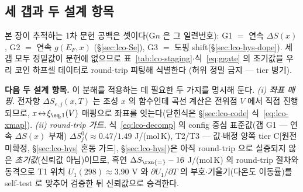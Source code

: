 \subsection{세 갭과 두 설계 항목}\label{sec:lco-decomp-gaps}
본 장이 추적하는 1차 문헌 공백은 셋이다(G$n$ 은 그 일련번호): G1 $=$ 연속 $\Delta S(x)$, G2 $=$ 연속 $g(E_F,x)$
(\S\ref{sec:lco-Se}), G3 $=$ 도핑 shift(\S\ref{sec:lco-hys-dope}). 세 갭 모두 정밀값이 문헌에 없으므로
표~\ref{tab:lco-staging}$\cdot$식~\eqref{eq:ggate} 의 초기값을 우리 코인 하프셀 데이터로 round-trip 피팅해 식별한다
(허위 정밀 금지 --- tier 병기).

\textbf{다음 두 설계 항목.} 이 분해를 적용하는 데 필요한 두 가지를 명시해 둔다.
\emph{(i) 좌표 매핑.} 전자항 $\Delta S_{e,j}(x,T)$ 는 조성 $x$ 의 함수인데 곡선 계산은 전위점 $V$ 에서 직접 진행되므로,
$x\!\leftrightarrow\!\xi_{\eq,1}(V)$ 매핑으로 좌표를 잇는다(닫힌식은 \S\ref{sec:lco-code} 식~\eqref{eq:lco-xmap}).
\emph{(ii) round-trip 가드.} 식~\eqref{eq:lco-decomp} 의 config 중심 표준값(갭 G1 --- 연속 $\Delta S(x)$ 부재)
$\Delta S_j^0$($\approx0.47/1.49$ J/(mol\,K), T2/T3 --- 값$\cdot$배정 양쪽 tier C[원전 미확정, \S\ref{sec:lco-hys} 혼동 가드],
\S\ref{sec:lco-hys})은 아직 round-trip 으로 실증되지 않은
\emph{초기값}(신뢰값 아님)이므로, 흑연 $\Delta S_\rxn{=}-16$ J/(mol\,K) 의 round-trip 절차와 동격으로 T1 위치
$U_1(298)\approx3.90$ V 와 $\partial U_1/\partial T$ 의 부호$\cdot$기울기(다온도 이동률)를 self-test 로 맞추어
검증한 뒤 신뢰값으로 승격한다.

